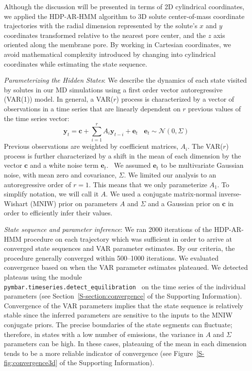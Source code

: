 \documentclass[journal=jpcbfk,manuscript=article]{achemso}
\begin{document}
  Although the discussion will be presented in terms of 2D cylindrical coordinates, we
  applied the HDP-AR-HMM algorithm to 3D solute center-of-mass coordinate trajectories 
  with the radial dimension represented by the solute's $x$ and $y$ coordinates 
  transformed relative to the nearest pore center, and the $z$ axis oriented along 
  the membrane pore. By working in Cartesian coordinates, we avoid mathematical 
  complexity introduced by changing into cylindrical coordinates while
  estimating the state sequence.
  
  \textit{Parameterizing the Hidden States}: We describe the dynamics of each 
  state visited by solutes in our MD simulations using a first order vector 
  autoregressive (VAR(1)) model. In general, a VAR($r$) process is characterized by a
  vector of observations in a time series that are linearly dependent on $r$ previous
  values of the time series vector:
  \begin{equation}
  	\mathbf{y}_t = \mathbf{c} + \sum_{i=1}^r A_i\mathbf{y}_{t-i} + \mathbf{e}_t~~~~\mathbf{e}_t \sim \mathcal{N}(0, \Sigma)
  \label{eqn:var}
  \end{equation}
  Previous observations are weighted by coefficient matrices, $A_i$. The VAR($r$) 
  process is further characterized by a shift in the mean of each dimension by the
  vector $\mathbf{c}$ and a white noise term $\mathbf{e}_t$.~\cite{hamilton_time_1994}
  We assumed $\mathbf{e}_t$ to be multivariate Gaussian noise, with mean zero and
  covariance, $\Sigma$. We limited our analysis to an autoregressive order of $r=1$.
  This means that we only parameterize $A_1$. To simplify notation, we will call it $A$. 
  We used a conjugate matrix-normal inverse-Wishart (MNIW) prior on parameters 
  $A$ and $\Sigma$ and a Gaussian prior on $\mathbf{c}$ in order to efficiently infer their 
  values.~\cite{fox_nonparametric_2009}
  
  \textit{State sequence and parameter inference}: We ran 2000 iterations of the
  HDP-AR-HMM procedure on each trajectory which was sufficient in order to arrive
  at converged state sequences and VAR parameter estimates. By our criteria, the 
  procedure generally converged within 500--1000 iterations. We evaluated 
  convergence based on when the VAR parameter estimates plateaued. We detected 
  plateaus using the module \\ \texttt{pymbar.timeseries.detect\_equilibration}~\cite{chodera_simple_2016} 
  on the time series of the individual parameters (see Section~\ref{S-section:convergence}
  of the Supporting Information). Convergence of the VAR parameters implies that
  the state sequence is relatively stable since the inferred parameters are 
  sensitive to the inputs to the MNIW conjugate priors. The precise boundaries of 
  the state segments can fluctuate; therefore, in states with a low number of 
  emissions, the variance in $A$ and $\Sigma$ parameters can be high. In these 
  cases, plateauing of the mean in each dimension tends to be a more reliable 
  indicator of convergence (see Figure~\ref{S-fig:convergence3d} of the Supporting
  Information).
  
\end{document}

